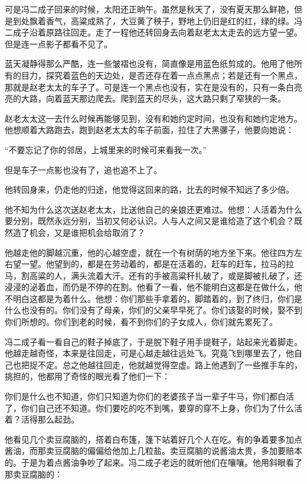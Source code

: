\par 可是冯二成子回来的时候，太阳还正晌午。虽然是秋天了，没有夏天那么鲜艳，但是到处飘着香气，高粱成熟了，大豆黄了秧子，野地上仍旧是红的红，绿的绿。冯二成子沿着原路往回走。走了一程他还转回身去向着赵老太太走去的远方望一望。但是连一点影子都看不见了。
\par 蓝天凝静得那么严酷，连一些皱褶也没有，简直像是用蓝色纸剪成的。他用了他所有的目力，探究着蓝色的天边处，是否还存在着一点点黑点；若是还有一个黑点，那就是赵老太太的车子了。可是连一个黑点也没有，实在是没有的，只有一条白亮亮的大路，向着蓝天那边爬去。爬到蓝天的尽头，这大路只剩了窄狭的一条。
\par 赵老太太这一去什么时候再能够见到，没有和她约定时间，也没有和她约定地方。他想顺着大路跑去，跑到赵老太太的车子前面，拉住了大黑骡子，他要向她说：
\par “不要忘记了你的邻居，上城里来的时候可来看我一次。”
\par 但是车子一点影也没有了，追也追不上了。
\par 他转回身来，仍走他的归途，他觉得这回来的路，比去的时候不知远了多少倍。
\par 他不知为什么这次送赵老太太，比送他自己的亲娘还更难过。他想：人活着为什么要分别，既然永远分别，当初又何必认识。人与人之间又是谁给造了这个机会？既然造了机会，又是谁把机会给取消了？
\par 他越走他的脚越沉重，他的心越空虚，就在一个有树荫的地方坐下来。他往四方左右望一望。他望到的，都是在劳动着的，都是在活着的，赶车的赶车，拉马的拉马，割高粱的人，满头流着大汗。还有的手被高粱秆扎破了，或是脚被扎破了，还浸浸的泌着血，而仍是不停的在割。他看了一看，他不能明白这都是在做什么，他不明白这都是为着什么。他想：你们那些手拿着的，脚踏着的，到了终归，你们是什么也没有的。你们没有了母亲，你们的父亲早早死了。你们该娶的时候，娶不到你们所想的。你们到老的时候，看不到你们的子女成人，你们就先累死了。
\par 冯二成子看一看自己的鞋子掉底了，于是脱下鞋子用手提鞋子，站起来光着脚走。他越走越奇怪，本来是往回走，可是心越走越往远处飞。究竟飞到哪里去了，他自己也把捉不定。总之他越往回走，他就越觉得空虚。路上他遇到了一些推手车的，挑担的，他都用了奇怪的眼光看了他们一下：
\par 你们是什么也不知道，你们只知道为你们的老婆孩子当一辈子牛马，你们都白活了，你们自己还不知道。你们要吃的吃不到嘴，要穿的穿不上身，你们为了什么活着？活得那么起劲。
\par 他看见几个卖豆腐脑的，搭着白布篷，篷下站着好几个人在吃。有的争着要多加点酱油，而那卖豆腐脑的偏偏给他加上几粒盐。卖豆腐脑的说酱油太贵，多加要赔本的。于是为着点酱油争吵了起来。冯二成子老远的就听他们在嚷嚷。他用斜眼看了那卖豆腐脑的：
